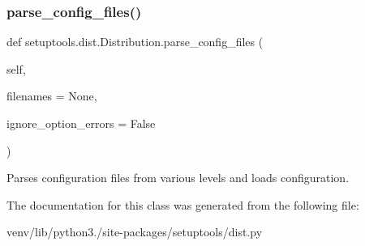 \subsubsection{\texorpdfstring{parse\+\_\+config\+\_\+files()}{parse\_config\_files()}}
{\footnotesize\ttfamily def setuptools.\+dist.\+Distribution.\+parse\+\_\+config\+\_\+files (\begin{DoxyParamCaption}\item[{}]{self,  }\item[{}]{filenames = {\ttfamily None},  }\item[{}]{ignore\+\_\+option\+\_\+errors = {\ttfamily False} }\end{DoxyParamCaption})}

\begin{DoxyVerb}Parses configuration files from various levels
and loads configuration.\end{DoxyVerb}
 

The documentation for this class was generated from the following file\+:\begin{DoxyCompactItemize}
\item 
venv/lib/python3./site-\/packages/setuptools/dist.\+py\end{DoxyCompactItemize}
